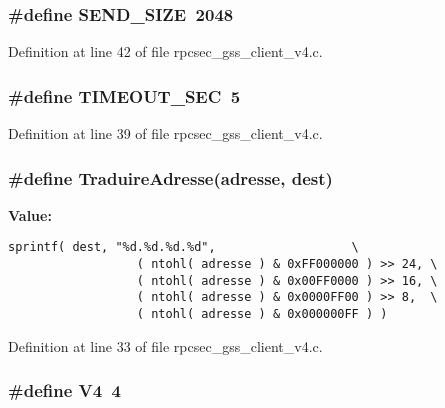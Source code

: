 \subsubsection{\setlength{\rightskip}{0pt plus 5cm}\#define SEND\_\-SIZE\ 2048}\label{rpcsec__gss__client__v4_8c_a4}




Definition at line 42 of file rpcsec\_\-gss\_\-client\_\-v4.c.
\subsubsection{\setlength{\rightskip}{0pt plus 5cm}\#define TIMEOUT\_\-SEC\ 5}\label{rpcsec__gss__client__v4_8c_a1}




Definition at line 39 of file rpcsec\_\-gss\_\-client\_\-v4.c.
\subsubsection{\setlength{\rightskip}{0pt plus 5cm}\#define Traduire\-Adresse(adresse, dest)}\label{rpcsec__gss__client__v4_8c_a0}


{\bf Value:}

\footnotesize\begin{verbatim}sprintf( dest, "%d.%d.%d.%d",                   \
                  ( ntohl( adresse ) & 0xFF000000 ) >> 24, \
                  ( ntohl( adresse ) & 0x00FF0000 ) >> 16, \
                  ( ntohl( adresse ) & 0x0000FF00 ) >> 8,  \
                  ( ntohl( adresse ) & 0x000000FF ) )
\end{verbatim}\normalsize 


Definition at line 33 of file rpcsec\_\-gss\_\-client\_\-v4.c.
\subsubsection{\setlength{\rightskip}{0pt plus 5cm}\#define V4\ 4}\label{rpcsec__gss__client__v4_8c_a5}




